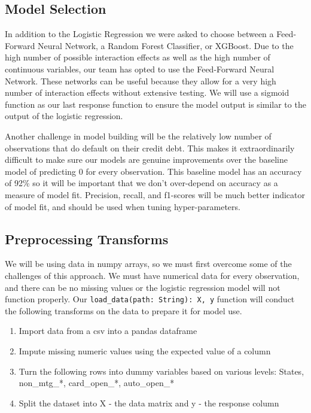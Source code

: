 \documentclass[12pt]{article}
\begin{document}
	\subsection{Model Selection}
	
	In addition to the Logistic Regression we were asked to choose between a Feed-Forward Neural Network, a Random Forest Classifier, or XGBoost. Due to the high number of possible interaction effects as well as the high number of continuous variables, our team has opted to use the Feed-Forward Neural Network. These networks can be useful because they allow for a very high number of interaction effects without extensive testing. We will use a sigmoid function as our last response function to ensure the model output is similar to the output of the logistic regression.
	
	Another challenge in model building will be the relatively low number of observations that do default on their credit debt. This makes it extraordinarily difficult to make sure our models are genuine improvements over the baseline model of predicting 0 for every observation. This baseline model has an accuracy of 92\% so it will be important that we don't over-depend on accuracy as a measure of model fit. Precision, recall, and f1-scores will be much better indicator of model fit, and should be used when tuning hyper-parameters. 
	
	\subsection{Preprocessing Transforms}
	
	We will be using data in numpy arrays, so we must first overcome some of the challenges of this approach. We must have numerical data for every observation, and there can be no missing values or the logistic regression model will not function properly. Our \verb|load_data(path: String): X, y| function will conduct the following transforms on the data to prepare it for model use. 
	
	\begin{enumerate}
		\item Import data from a csv into a pandas dataframe
		\item Impute missing numeric values using the expected value of a column
		\item Turn the following rows into dummy variables based on various levels: States, non\_mtg\_*, card\_open\_*, auto\_open\_*
		\item Split the dataset into X - the data matrix and y - the response column
	\end{enumerate}
	
\end{document}

